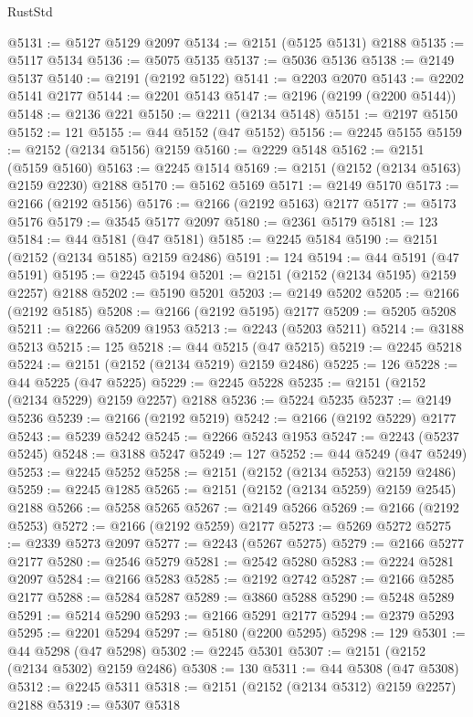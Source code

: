 \begin{lexlean}{RustStd}
\begin{coremodule}
@5131 := @5127 @5129 @2097
@5134 := @2151 (@5125 @5131) @2188
@5135 := @5117 @5134
@5136 := @5075 @5135
@5137 := @5036 @5136
@5138 := @2149 @5137
@5140 := @2191 (@2192 @5122)
@5141 := @2203 @2070
@5143 := @2202 @5141 @2177
@5144 := @2201 @5143
@5147 := @2196 (@2199 (@2200 @5144))
@5148 := @2136 @221
@5150 := @2211 (@2134 @5148)
@5151 := @2197 @5150
@5152 := 121
@5155 := @44 @5152 (@47 @5152)
@5156 := @2245 @5155
@5159 := @2152 (@2134 @5156) @2159
@5160 := @2229 @5148
@5162 := @2151 (@5159 @5160)
@5163 := @2245 @1514
@5169 := @2151 (@2152 (@2134 @5163) @2159 @2230) @2188
@5170 := @5162 @5169
@5171 := @2149 @5170
@5173 := @2166 (@2192 @5156)
@5176 := @2166 (@2192 @5163) @2177
@5177 := @5173 @5176
@5179 := @3545 @5177 @2097
@5180 := @2361 @5179
@5181 := 123
@5184 := @44 @5181 (@47 @5181)
@5185 := @2245 @5184
@5190 := @2151 (@2152 (@2134 @5185) @2159 @2486)
@5191 := 124
@5194 := @44 @5191 (@47 @5191)
@5195 := @2245 @5194
@5201 := @2151 (@2152 (@2134 @5195) @2159 @2257) @2188
@5202 := @5190 @5201
@5203 := @2149 @5202
@5205 := @2166 (@2192 @5185)
@5208 := @2166 (@2192 @5195) @2177
@5209 := @5205 @5208
@5211 := @2266 @5209 @1953
@5213 := @2243 (@5203 @5211)
@5214 := @3188 @5213
@5215 := 125
@5218 := @44 @5215 (@47 @5215)
@5219 := @2245 @5218
@5224 := @2151 (@2152 (@2134 @5219) @2159 @2486)
@5225 := 126
@5228 := @44 @5225 (@47 @5225)
@5229 := @2245 @5228
@5235 := @2151 (@2152 (@2134 @5229) @2159 @2257) @2188
@5236 := @5224 @5235
@5237 := @2149 @5236
@5239 := @2166 (@2192 @5219)
@5242 := @2166 (@2192 @5229) @2177
@5243 := @5239 @5242
@5245 := @2266 @5243 @1953
@5247 := @2243 (@5237 @5245)
@5248 := @3188 @5247
@5249 := 127
@5252 := @44 @5249 (@47 @5249)
@5253 := @2245 @5252
@5258 := @2151 (@2152 (@2134 @5253) @2159 @2486)
@5259 := @2245 @1285
@5265 := @2151 (@2152 (@2134 @5259) @2159 @2545) @2188
@5266 := @5258 @5265
@5267 := @2149 @5266
@5269 := @2166 (@2192 @5253)
@5272 := @2166 (@2192 @5259) @2177
@5273 := @5269 @5272
@5275 := @2339 @5273 @2097
@5277 := @2243 (@5267 @5275)
@5279 := @2166 @5277 @2177
@5280 := @2546 @5279
@5281 := @2542 @5280
@5283 := @2224 @5281 @2097
@5284 := @2166 @5283
@5285 := @2192 @2742
@5287 := @2166 @5285 @2177
@5288 := @5284 @5287
@5289 := @3860 @5288
@5290 := @5248 @5289
@5291 := @5214 @5290
@5293 := @2166 @5291 @2177
@5294 := @2379 @5293
@5295 := @2201 @5294
@5297 := @5180 (@2200 @5295)
@5298 := 129
@5301 := @44 @5298 (@47 @5298)
@5302 := @2245 @5301
@5307 := @2151 (@2152 (@2134 @5302) @2159 @2486)
@5308 := 130
@5311 := @44 @5308 (@47 @5308)
@5312 := @2245 @5311
@5318 := @2151 (@2152 (@2134 @5312) @2159 @2257) @2188
@5319 := @5307 @5318

\end{coremodule}
\end{lexlean}

